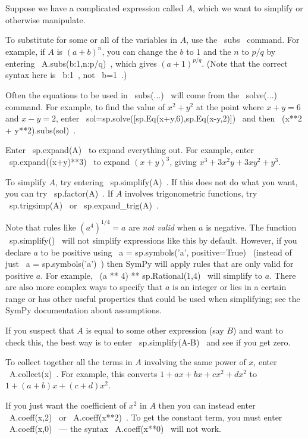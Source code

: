 \documentclass[a4paper,10pt]{amsbook}
\begin{document}
Suppose we have a complicated expression called $A$, which we want to
simplify or otherwise manipulate. 
\begin{secenum}
 \item\label{subs} To substitute for some or all of the variables in
  $A$, use the \pcode~subs~ command.  For example, if $A$ is
  $(a+b)^n$, you can change the $b$ to $1$ and the $n$ to
  $p/q$ by entering \pcode~A.subs({b:1,n:p/q})~, which gives
  $(a+1)^{p/q}$.  (Note that the correct syntax here is \pcode~b:1~,
  not \pcode~b=1~.)
%
 \item\label{solvesubs}
  Often the equations to be used in \pcode~subs(...)~ will
  come from the \pcode~solve(...)~ command.  For example, to
  find the value of $x^2+y^2$ at the point where $x+y=6$ and
  $x-y=2$, enter \pcode~sol=sp.solve([sp.Eq(x+y,6),sp.Eq(x-y,2)])~ 
  and then \pcode~(x**2 + y**2).subs(sol)~.
%
 \item\label{expand} Enter \pcode~sp.expand(A)~ to expand everything out.  For
  example, enter \pcode~sp.expand((x+y)**3)~ to expand
  $(x+y)^3$, giving $x^3+3x^2y+3xy^2+y^3$. 
%
 \item\label{simplify} To simplify $A$, try entering
  \pcode~sp.simplify(A)~.  If this 
  does not do what you want, you can try \pcode~sp.factor(A)~. 
  If $A$ involves trigonometric functions, try
  \pcode~sp.trigsimp(A)~ or \pcode~sp.expand_trig(A)~. 
%
 \item\label{symbolic} Note that rules like $(a^4)^{1/4}=a$ are
  \emph{not valid} when $a$ is negative.  The function
  \pcode~sp.simplify()~ will not simplify expressions like this by
  default.  However, if you declare $a$ to be positive using
  \pcode~a = sp.symbols('a', positive=True)~ (instead of just
  \pcode~a = sp.symbols('a')~) then SymPy will apply rules that are
  only valid for positive $a$.  For example,
  \pcode~(a ** 4) ** sp.Rational(1,4)~ will simplify to $a$.  There
  are also more complex ways to specify that $a$ is an integer or lies
  in a certain range or has other useful properties that could be used
  when simplifying; see the SymPy documentation about assumptions.
%
 \item\label{testequal} If you suspect that $A$ is equal to some other expression (say
  $B$) and want to check this, the best way is to enter
  \pcode~sp.simplify(A-B)~ and see if you get zero. 
%
 \item\label{collect} To collect together all the terms in $A$ involving the same
  power of $x$, enter \pcode~A.collect(x)~.  For example, this converts
  $1+ax+bx+cx^2+dx^2$ to $1+(a+b)x+(c+d)x^2$. 
%
 \item\label{coeff}
  If you just want the
  coefficient of $x^2$ in $A$ then you can instead enter \pcode~A.coeff(x,2)~
  or \pcode~A.coeff(x**2)~.  To get the constant term, you
  must enter \pcode~A.coeff(x,0)~ --- the syntax
  \pcode~A.coeff(x**0)~ will not work. 
\end{secenum}
\end{document}
